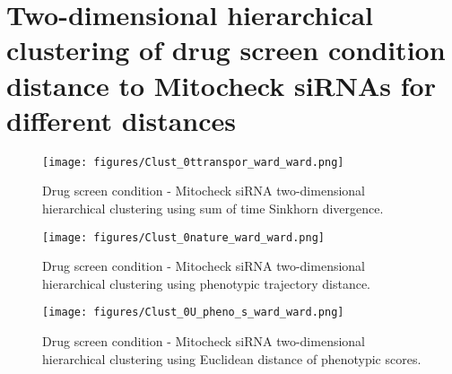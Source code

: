 \clearpage
\section{Two-dimensional hierarchical clustering of drug screen condition distance to Mitocheck siRNAs for different distances}
\label{heatmaps}

\begin{figure*}[ht!]
\centerline{\texttt{[image: figures/Clust\_0ttranspor\_ward\_ward.png]}
}
\caption{Drug screen condition - Mitocheck siRNA two-dimensional hierarchical clustering using sum of time Sinkhorn divergence.}
\label{cond_clust_ttransport}
\end{figure*}

\begin{figure*}[ht!]
\centerline{\texttt{[image: figures/Clust\_0nature\_ward\_ward.png]}
}
\caption{Drug screen condition - Mitocheck siRNA two-dimensional hierarchical clustering using phenotypic trajectory distance.}
\label{cond_clust_transport}
\end{figure*}

\begin{figure*}[ht!]
\centerline{\texttt{[image: figures/Clust\_0U\_pheno\_s\_ward\_ward.png]}
}
\caption{Drug screen condition - Mitocheck siRNA two-dimensional hierarchical clustering using Euclidean distance of phenotypic scores.}
\label{cond_clust_transport}
\end{figure*}



\clearpage
